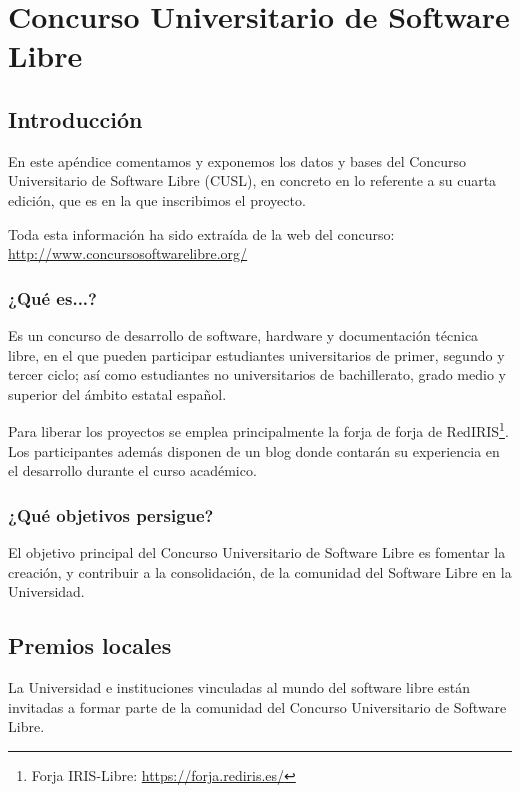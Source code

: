\chapter*{Concurso Universitario de Software Libre} \label{ap2}

\vspace*{5mm}

\section*{Introducción}

En este apéndice comentamos y exponemos los datos y bases del Concurso
Universitario de Software Libre (CUSL), en concreto en lo referente a su cuarta
edición, que es en la que inscribimos el proyecto.

Toda esta información ha sido extraída de la web del concurso:
\url{http://www.concursosoftwarelibre.org/}

\subsection*{¿Qué es...?}

Es un concurso de desarrollo de software, hardware y documentación técnica
libre, en el que pueden participar estudiantes universitarios de primer,
segundo y tercer ciclo; así como estudiantes no universitarios de bachillerato,
grado medio y superior del ámbito estatal español.

Para liberar los proyectos se emplea principalmente la forja de forja de
RedIRIS\footnote{Forja IRIS-Libre: \url{https://forja.rediris.es/}}. Los
participantes además disponen de un blog donde contarán su experiencia en el
desarrollo durante el curso académico.

\subsection*{¿Qué objetivos persigue?}

El objetivo principal del Concurso Universitario de Software Libre es fomentar
la creación, y contribuir a la consolidación, de la comunidad del Software Libre
en la Universidad.

\section*{Premios locales}

La Universidad e instituciones vinculadas al mundo del software libre están
invitadas a formar parte de la comunidad del Concurso Universitario de Software
Libre.

